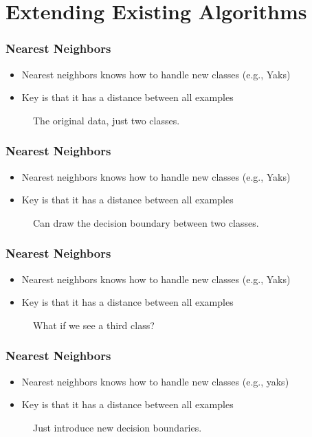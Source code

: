 \documentclass[10pt,mathserif]{beamer}
\begin{document}
\section{Extending Existing Algorithms}

\begin{frame}
  \frametitle{Nearest Neighbors}
  \begin{itemize}
  \item Nearest neighbors knows how to handle new classes (e.g., Yaks)
  \item Key is that it has a distance between all examples
  \end{itemize} 
  \begin{figure}[ht]
    \centering
    \caption{The original data, just two classes. \label{fig:nneighbor_1} }
  \end{figure}
\end{frame}

\begin{frame}
  \frametitle{Nearest Neighbors}
 \begin{itemize}
 \item Nearest neighbors knows how to handle new classes (e.g., Yaks)
 \item Key is that it has a distance between all examples
 \end{itemize} 
\begin{figure}[ht]
  \centering
  \caption{Can draw the decision boundary between two classes. \label{fig:nneighbor_2} }
\end{figure}
\end{frame}

\begin{frame}
  \frametitle{Nearest Neighbors}
 \begin{itemize}
 \item Nearest neighbors knows how to handle new classes (e.g., Yaks)
 \item Key is that it has a distance between all examples
 \end{itemize} 
\begin{figure}[ht]
  \centering
  \caption{What if we see a third class? \label{fig:nneighbor_3} }
\end{figure}
\end{frame}

\begin{frame}
  \frametitle{Nearest Neighbors}
  \begin{itemize}
  \item Nearest neighbors knows how to handle new classes (e.g., yaks)
  \item Key is that it has a distance between all examples
  \end{itemize} 
  \begin{figure}[ht]
    \centering
    \caption{Just introduce new decision boundaries. \label{fig:nneighbor_4} }
  \end{figure}
\end{frame}
\end{document}
